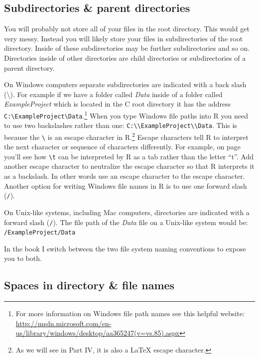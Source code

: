 \documentclass[krantz1]{krantz}
\begin{document}
\subsection{Subdirectories \& parent directories}

You will probably not store all of your files in the root directory. This would get very messy. Instead you will likely store your files in subdirectories of the root directory. Inside of these subdirectories may be further subdirectories and so on.  Directories inside of other directories are child directories or subdirectories of a parent directory.

On Windows computers separate subdirectories are indicated with a back slash (\textbackslash{}). For example if we have a folder called {\emph{Data}} inside of a folder called {\emph{ExampleProject}} which is located in the C root directory it has the address \texttt{C:\textbackslash{}ExampleProject\textbackslash{}Data}.\footnote{For more information on Windows file path names see this helpful website: \url{http://msdn.microsoft.com/en-us/library/windows/desktop/aa365247(v=vs.85).aspx}} When you type Windows file paths into R you need to use two backslashes rather than one: \texttt{C:\textbackslash{}\textbackslash{}ExampleProject\textbackslash{}\textbackslash{}Data}. This is because the \texttt{\textbackslash{}} is an escape character in R.\footnote{As we will see in Part IV, it is also a LaTeX escape character.} Escape characters tell R to interpret the next character or sequence of characters differently. For example, on page \pageref{TSVEscape} you'll see how \texttt{\textbackslash{}t} can be interpreted by R as a tab rather than the letter ``t''. Add another escape character to neutralize the escape character so that R interprets it as a backslash. In other words use an escape character to the escape character. Another option for writing Windows file names in R is to use one forward slash (\texttt{/}).  

On Unix-like systems, including Mac computers, directories are indicated with a forward slash (\texttt{/}). The file path of the {\emph{Data}} file on a Unix-like system would be: \texttt{/ExampleProject/Data}

In the book I switch between the two file system naming conventions to expose you to both.

\subsection{Spaces in directory \& file names}
\end{document}
